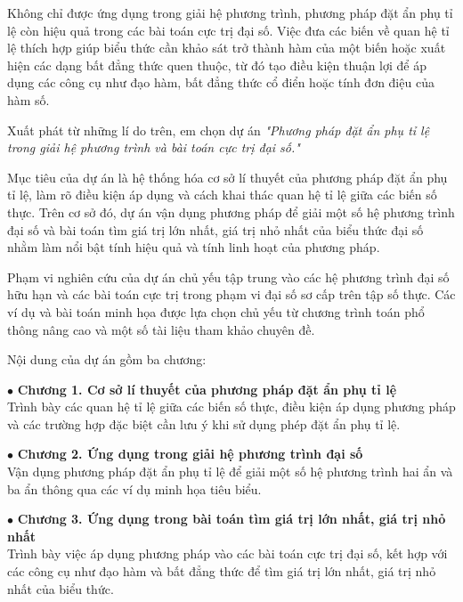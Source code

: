\documentclass[12pt]{report}
\begin{document}
\vspace{0.3cm}
\noindent Không chỉ được ứng dụng trong giải hệ phương trình, phương pháp đặt ẩn phụ tỉ lệ còn hiệu quả trong các bài toán cực trị đại số. Việc đưa các biến về quan hệ tỉ lệ thích hợp giúp biểu thức cần khảo sát trở thành hàm của một biến hoặc xuất hiện các dạng bất đẳng thức quen thuộc, từ đó tạo điều kiện thuận lợi để áp dụng các công cụ như đạo hàm, bất đẳng thức cổ điển hoặc tính đơn điệu của hàm số.

\vspace{0.3cm}
\noindent Xuất phát từ những lí do trên, em chọn dự án \textit{"Phương pháp đặt ẩn phụ tỉ lệ trong giải hệ phương trình và bài toán cực trị đại số."}

\vspace{0.3cm}
\noindent Mục tiêu của dự án là hệ thống hóa cơ sở lí thuyết của phương pháp đặt ẩn phụ tỉ lệ, làm rõ điều kiện áp dụng và cách khai thác quan hệ tỉ lệ giữa các biến số thực. Trên cơ sở đó, dự án vận dụng phương pháp để giải một số hệ phương trình đại số và bài toán tìm giá trị lớn nhất, giá trị nhỏ nhất của biểu thức đại số nhằm làm nổi bật tính hiệu quả và tính linh hoạt của phương pháp.

\vspace{0.3cm}
\noindent Phạm vi nghiên cứu của dự án chủ yếu tập trung vào các hệ phương trình đại số hữu hạn và các bài toán cực trị trong phạm vi đại số sơ cấp trên tập số thực. Các ví dụ và bài toán minh họa được lựa chọn chủ yếu từ chương trình toán phổ thông nâng cao và một số tài liệu tham khảo chuyên đề.

\vspace{0.3cm}
\noindent Nội dung của dự án gồm ba chương:

\vspace{0.2cm}
\noindent $\bullet$ \textbf{Chương 1. Cơ sở lí thuyết của phương pháp đặt ẩn phụ tỉ lệ} \\
Trình bày các quan hệ tỉ lệ giữa các biến số thực, điều kiện áp dụng phương pháp và các trường hợp đặc biệt cần lưu ý khi sử dụng phép đặt ẩn phụ tỉ lệ.

\vspace{0.2cm}
\noindent $\bullet$ \textbf{Chương 2. Ứng dụng trong giải hệ phương trình đại số} \\
Vận dụng phương pháp đặt ẩn phụ tỉ lệ để giải một số hệ phương trình hai ẩn và ba ẩn thông qua các ví dụ minh họa tiêu biểu.

\vspace{0.2cm}
\noindent $\bullet$ \textbf{Chương 3. Ứng dụng trong bài toán tìm giá trị lớn nhất, giá trị nhỏ nhất} \\
Trình bày việc áp dụng phương pháp vào các bài toán cực trị đại số, kết hợp với các công cụ như đạo hàm và bất đẳng thức để tìm giá trị lớn nhất, giá trị nhỏ nhất của biểu thức.
\end{document}
